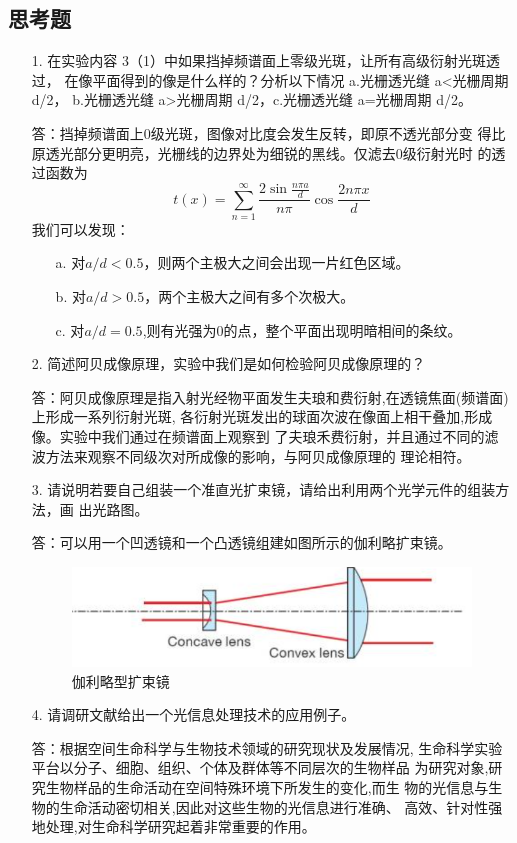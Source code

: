 \documentclass{ctexart}
\begin{document}
	\subsection*{思考题}
	\begin{itemize}
		\item [1.] 在实验内容 3（1）中如果挡掉频谱面上零级光斑，让所有高级衍射光斑透过，
		在像平面得到的像是什么样的？分析以下情况 a.光栅透光缝 a<光栅周期 d/2，
		b.光栅透光缝 a>光栅周期 d/2，c.光栅透光缝 a=光栅周期 d/2。
		\item [ ]答：挡掉频谱面上0级光斑，图像对比度会发生反转，即原不透光部分变
		得比原透光部分更明亮，光栅线的边界处为细锐的黑线\cite{art1}。仅滤去0级衍射光时
		的透过函数为
		$$t(x) = \sum_{n=1}^\infty\frac{2\sin{\frac{n\pi a}{d}}}{n\pi}\cos{\frac{2n\pi x}{d}}$$
		我们可以发现：
		\begin{itemize}
			\item [a.] 对$a/d < 0.5$，则两个主极大之间会出现一片红色区域。
   
			\item [b.] 对$a/d > 0.5$，两个主极大之间有多个次极大。
			
			\item [c.] 对$a/d = 0.5$,则有光强为0的点，整个平面出现明暗相间的条纹。
 		\end{itemize}
		\item [2.] 简述阿贝成像原理，实验中我们是如何检验阿贝成像原理的？
		\item [ ]答：阿贝成像原理是指入射光经物平面发生夫琅和费衍射,在透镜焦面(频谱面)上形成一系列衍射光斑,
		各衍射光斑发出的球面次波在像面上相干叠加,形成像。实验中我们通过在频谱面上观察到
		了夫琅禾费衍射，并且通过不同的滤波方法来观察不同级次对所成像的影响，与阿贝成像原理的
		理论相符。
		\item [3.]请说明若要自己组装一个准直光扩束镜，请给出利用两个光学元件的组装方法，画
		出光路图。
		\item [ ]答：可以用一个凹透镜和一个凸透镜组建如图所示的伽利略扩束镜。
		\begin{figure}[htbp]
			\centering
			\includegraphics[scale=0.5]{5.png}
			\caption{伽利略型扩束镜}
		\end{figure}
		\item [4.]请调研文献给出一个光信息处理技术的应用例子。
		\item [ ]答：根据空间生命科学与生物技术领域的研究现状及发展情况,
		生命科学实验平台以分子、细胞、组织、个体及群体等不同层次的生物样品
		为研究对象,研究生物样品的生命活动在空间特殊环境下所发生的变化,而生
		物的光信息与生物的生命活动密切相关,因此对这些生物的光信息进行准确、
		高效、针对性强地处理,对生命科学研究起着非常重要的作用\cite{赵青青2017生物光信息处理技术研究}。
	\end{itemize}
\end{document}
